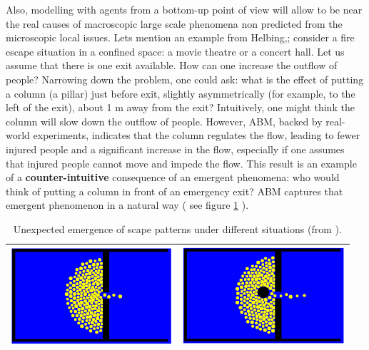 \documentclass[11pt,oneside,a4paper,openright]{report}
\begin{document}
Also, modelling with agents from a bottom-up point of view will allow to be near the real causes of macroscopic large scale phenomena non predicted from the microscopic local issues. 
Lets mention an example from Helbing,\cite{Helbing2000}; consider a fire escape situation in a confined space: a movie theatre or a concert hall. Let us assume that there is one exit available. How can one increase the outflow of people? Narrowing down the problem, one could ask: what is the effect of putting a column (a pillar) just before exit, slightly asymmetrically (for example, to the left of the exit), about 1 m away from the exit? Intuitively, one might think the column will slow down the outflow of people. However, ABM, backed by real-world experiments, indicates that the column regulates the flow, leading to fewer injured people and a significant increase in the flow, especially if one assumes that injured people cannot move and impede the flow. This result is an example of a \textbf{counter-intuitive} consequence of an emergent phenomena: who would think of putting a column in front of an emergency exit? ABM captures that emergent phenomenon in a natural way ( see figure \ref{tab:columnExit} ).\\
	\begin{table}[ht!]
	\centering
	\begin{tabular}{|c|c|}
		\hline
		\includegraphics[width=60mm,keepaspectratio=true]{figures/column1.png}
		&
		\includegraphics[width=60mm,keepaspectratio=true]{figures/column2.png}\\
		\hline
	\end{tabular}
	\caption{Unexpected emergence of scape patterns under different situations (from \cite{Bonabeau2002}).}
	\label{tab:columnExit}
	\end{table}
\end{document}
